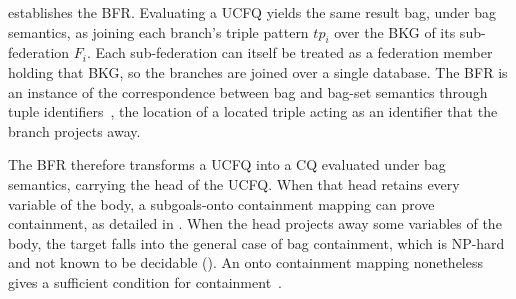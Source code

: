 \documentclass[../main]{subfiles}
\begin{document}
 establishes the \ac{BFR}.
Evaluating a \ac{UCFQ} yields the same result bag, under bag semantics, as joining each branch's triple pattern $\mathit{tp}_i$ over the \ac{BKG} of its sub-federation $F_i$.
Each sub-federation can itself be treated as a federation member holding that \ac{BKG}, so the branches are joined over a single database.
The \ac{BFR} is an instance of the correspondence between bag and bag-set semantics through tuple identifiers~\cite{Chaudhuri1993, Jayram2006}, the location of a located triple acting as an identifier that the branch projects away.

The \ac{BFR} therefore transforms a \ac{UCFQ} into a \ac{CQ} evaluated under bag semantics, carrying the head of the \ac{UCFQ}.
When that head retains every variable of the body, a subgoals-onto containment mapping can prove containment, as detailed in .
When the head projects away some variables of the body, the target falls into the general case of bag containment, which is NP-hard and not known to be decidable ().
An onto containment mapping nonetheless gives a sufficient condition for containment~\cite{Chaudhuri1993}.
\end{document}
